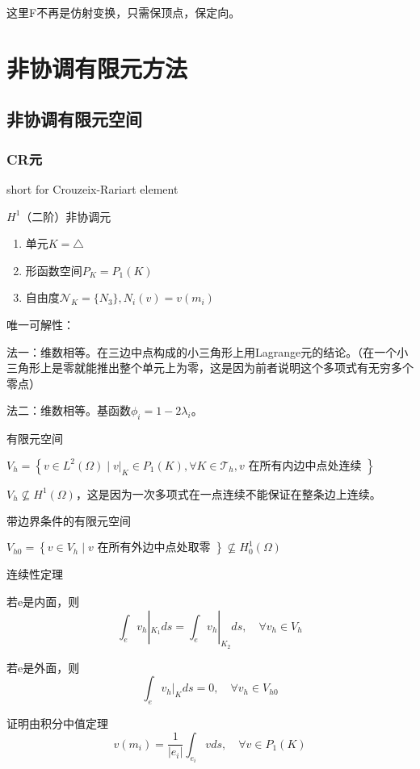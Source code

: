 这里F不再是仿射变换，只需保顶点，保定向。

\section{非协调有限元方法}

\subsection{非协调有限元空间}

\subsubsection{CR元}

short for Crouzeix-Rariart element

$H^1$（二阶）非协调元

\begin{enumerate}
  \item 单元$K = \triangle$
  \item 形函数空间$P_K = P_1(K)$
  \item 自由度$\mathcal{N}_K = \{N_{3}\}, N_i(v) = v(m_i)$
\end{enumerate}

唯一可解性：

法一：维数相等。在三边中点构成的小三角形上用Lagrange元的结论。（在一个小三角形上是零就能推出整个单元上为零，这是因为前者说明这个多项式有无穷多个零点）

法二：维数相等。基函数$\phi_i = 1 - 2\lambda_i$。

有限元空间

$V_{h}=\left\{v \in L^{2}(\Omega) \mid v|_{K} \in P_{1}(K), \forall K \in \mathcal{T}_{h}, v \text { 在所有内边中点处连续 }\right\}$

$V_h \nsubseteq H^1(\Omega)$，这是因为一次多项式在一点连续不能保证在整条边上连续。

带边界条件的有限元空间

$V_{h 0}=\left\{v \in V_{h} \mid v \text { 在所有外边中点处取零 }\right\} \nsubseteq H_{0}^{1}(\Omega)$

连续性定理

若e是内面，则
\[
  \int_{e} v_{h}|_{K_{1}} ds=\int_{e} v_{h}|_{K_{2}} ds, \quad \forall v_{h} \in V_{h}
\]

若e是外面，则
\[
  \int_{e} v_{h}|_{K} ds=0, \quad \forall v_{h} \in V_{h 0}
\]

证明由积分中值定理
\[
  v(m_{i})=\frac{1}{|e_{i}|} \int_{e_{i}} v ds, \quad \forall v \in P_{1}(K)
\]

